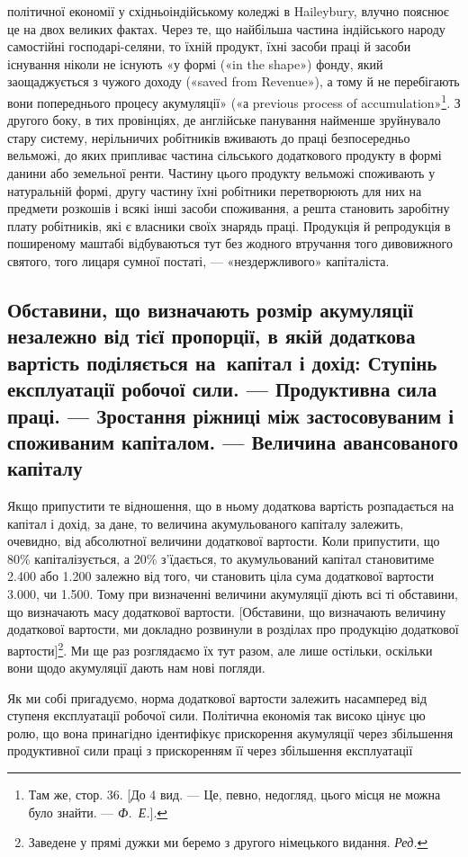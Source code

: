 \parcont{}  %
політичної економії у східньоіндійському коледжі в Haileybury,
влучно пояснює це на двох великих фактах. Через те, що
найбільша частина індійського народу самостійні господарі-селяни,
то їхній продукт, їхні засоби праці й засоби існування
ніколи не існують «у формі («in the shape») фонду, який заощаджується
з чужого доходу («saved from Revenue»), а тому
й не перебігають вони попереднього процесу акумуляції» («а
previous process of accumulation»\footnote{
Там же, стор. 36. [До 4 вид. — Це, певно, недогляд, цього місця
не можна було знайти. — \emph{Ф.~Е.}].
}. З другого боку, в тих провінціях,
де англійське панування найменше зруйнувало стару
систему, нерільничих робітників вживають до праці безпосередньо
вельможі, до яких припливає частина сільського додаткового продукту
в формі данини або земельної ренти. Частину цього продукту
вельможі споживають у натуральній формі, другу частину
їхні робітники перетворюють для них на предмети розкошів
і всякі інші засоби споживання, а решта становить заробітну
плату робітників, які є власники своїх знарядь праці. Продукція
й репродукція в поширеному маштабі відбуваються тут без
жодного втручання того дивовижного святого, того лицаря сумної
постаті, — «нездержливого» капіталіста.

\subsection{Обставини, що визначають розмір акумуляції незалежно від
тієї пропорції, в якій додаткова вартість поділяється на~капітал
і дохід: Ступінь експлуатації робочої сили. — Продуктивна
сила праці. — Зростання ріжниці між застосовуваним і споживаним
капіталом. — Величина авансованого капіталу}

Якщо припустити те відношення, що в ньому додаткова вартість
розпадається на капітал і дохід, за дане, то величина акумульованого
капіталу залежить, очевидно, від абсолютної величини
додаткової вартости. Коли припустити, що 80\% капіталізується,
а 20\% з’їдається, то акумульований капітал становитиме
\num{2.400} або \num{1.200} залежно
від того, чи становить ціла сума додаткової вартости \num{3.000}, чи \num{1.500}. Тому при визначенні
величини акумуляції діють всі ті обставини, що визначають масу
додаткової вартости. [Обставини, що визначають величину додаткової
вартости, ми докладно розвинули в розділах про продукцію
додаткової вартости]\footnote*{
Заведене у прямі дужки ми беремо з другого німецького видання.
\emph{Ред.}
}. Ми ще раз розглядаємо їх тут
разом, але лише остільки, оскільки вони щодо акумуляції дають
нам нові погляди.

Як ми собі пригадуємо, норма додаткової вартости залежить
насамперед від ступеня експлуатації робочої сили. Політична
економія так високо цінує цю ролю, що вона принагідно ідентифікує
прискорення акумуляції через збільшення продуктивної
сили праці з прискоренням її через збільшення експлуатації
\parbreak{}  %
